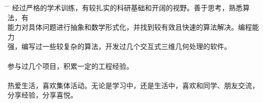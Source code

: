 \documentclass[20pt]{article} %
\begin{document}
\begin{tabbing}%
\hspace{5mm} \= \hspace{14cm} \= \kill %
\sqbullet \> {经过严格的学术训练，有较扎实的科研基础和开阔的视野。善于思考，熟悉算法，有}\\
\> {能力对具体问题进行抽象和数学形式化，并找到较有效且快速的算法解决。编程能力}\\
\> {强，编写过一些较复杂的算法，开发过几个交互式三维几何处理的软件。} \\%
\\
\sqbullet \> {参与过几个项目，积累一定的工程经验。}\\
\\
\sqbullet \> {热爱生活，喜欢集体活动。无论是学习中，还是生活中，喜欢和同学、朋友交流，}\\
\> {分享经验，分享喜悦。}
\end{tabbing}%




\end{document}
